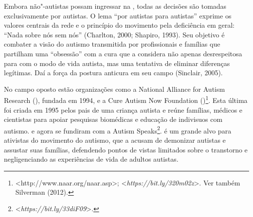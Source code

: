 Embora não"-autistas possam ingressar na , todas as decisões são
tomadas exclusivamente por autistas. O lema ``por autistas para
autistas'' exprime os valores centrais da rede e o princípio do
movimento pela deficiência em geral: ``Nada sobre nós sem nós''
(Charlton, 2000; Shapiro, 1993). Seu objetivo é combater a visão do
autismo transmitida por profissionais e famílias que partilham uma
``obsessão'' com a cura que a  considera não apenas desrespeitosa
para com o modo de vida autista, mas uma tentativa de eliminar
diferenças legítimas. Daí a força da postura anticura em seu campo
(Sinclair, 2005).

No campo oposto estão organizações como a National Alliance for Autism
Research (), fundada em 1994, e a Cure Autism Now Foundation
()\footnote[11]{\textless{}http://www.naar.org/naar.asp\textgreater{};
\textless{}\emph{https://bit.ly/320m02z}\textgreater{}.
Ver também Silverman (2012).}. Esta última foi criada em 1995 pelos pais de
uma criança autista e reúne famílias, médicos e cientistas para apoiar
pesquisas biomédicas e educação de indivisuos com autismo.  e 
agora se fundiram com a Autism Speaks\footnote[12]{\textless{}\emph{https://bit.ly/33diF09}\textgreater{}.}.  é um
grande alvo para ativistas do movimento do autismo, que a acusam de
demonizar autistas e assustar suas famílias, defendendo pontos de vistas
limitados sobre o transtorno e negligenciando as experiências de vida de
adultos autistas.

